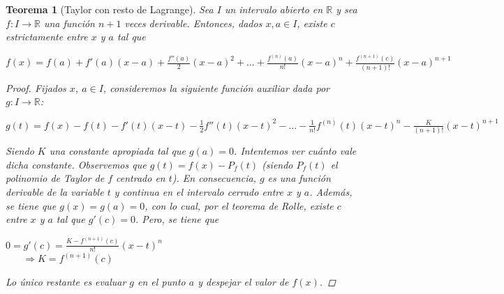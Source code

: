 \documentclass[]{article}
\newtheorem{teo}{Teorema}
\def\R{\mathbb{R}}
\begin{document}
\begin{teo}[Taylor con resto de Lagrange]
	Sea $I$ un intervalo abierto en $\R$ y sea $f:I\to\R$ una función $n+1$ veces derivable. Entonces, dados $x,a\in I$, existe $c$ estrictamente entre $x$ y $a$ tal que 
	\begin{center}
		$\displaystyle f(x) = f(a) + f'(a)(x-a) + \frac{f''(a)}{2}(x-a)^2 + \hdots + \frac{f^{(n)}(a)}{n!}(x-a)^n + \frac{f^{(n+1)}(c)}{(n+1)!}(x-a)^{n+1}$
	\end{center}
	\begin{proof}
		Fijados $x$, $a\in I$, consideremos la siguiente función auxiliar dada por $g:I\to\R$:
		\begin{center}
			$g(t) = f(x) - f(t) - f'(t)(x-t) - \frac{1}{2}f''(t)(x-t)^2 - \hdots - \frac{1}{n!}f^{(n)}(t)(x-t)^{n} - \frac{K}{(n+1)!}(x-t)^{n+1}$
		\end{center}
		Siendo $K$ una constante apropiada tal que $g(a) = 0$. Intentemos ver cuánto vale dicha constante. Observemos que $g(t) = f(x) - P_f(t)$ (siendo $P_f(t)$ el polinomio de Taylor de $f$ centrado en $t$). En consecuencia, $g$ es una función derivable de la variable $t$ y continua en el intervalo cerrado entre $x$ y $a$. Además, se tiene que $g(x) = g(a) = 0$, con lo cual, por el teorema de Rolle, existe $c$ entre $x$ y $a$ tal que $g'(c)=0$. Pero, se tiene que 
		\begin{center}
			$\displaystyle 0 = g'(c) = \frac{K-f^{(n+1)}(c)}{n!}(x-t)^n$\\
			~\newline
			~\newline
			$\Rightarrow K =f^{(n+1)}(c)$
		\end{center}
		Lo único restante es evaluar $g$ en el punto $a$ y despejar el valor de $f(x)$.
	\end{proof}
\end{teo}
\end{document}
